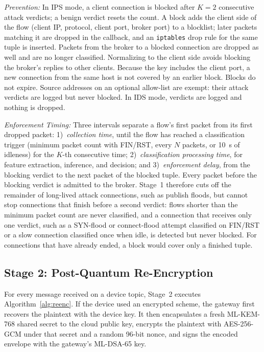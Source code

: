 \documentclass[journal]{IEEEtran}
\begin{document}
\textit{Prevention:} In IPS mode, a client connection is blocked after $K = 2$ consecutive attack verdicts; a benign verdict resets the count. A block adds the client side of the flow (client IP, protocol, client port, broker port) to a blocklist; later packets matching it are dropped in the callback, and an \texttt{iptables} drop rule for the same tuple is inserted. Packets from the broker to a blocked connection are dropped as well and are no longer classified. Normalizing to the client side avoids blocking the broker's replies to other clients. Because the key includes the client port, a new connection from the same host is not covered by an earlier block. Blocks do not expire. Source addresses on an optional allow-list are exempt: their attack verdicts are logged but never blocked. In IDS mode, verdicts are logged and nothing is dropped.

\textit{Enforcement Timing:} Three intervals separate a flow's first packet from its first dropped packet: 1)~\emph{collection time}, until the flow has reached a classification trigger (minimum packet count with FIN/RST, every $N$ packets, or 10~s of idleness) for the $K$-th consecutive time; 2)~\emph{classification processing time}, for feature extraction, inference, and decision; and 3)~\emph{enforcement delay}, from the blocking verdict to the next packet of the blocked tuple. Every packet before the blocking verdict is admitted to the broker. Stage~1 therefore cuts off the remainder of long-lived attack connections, such as publish floods, but cannot stop connections that finish before a second verdict: flows shorter than the minimum packet count are never classified, and a connection that receives only one verdict, such as a SYN-flood or connect-flood attempt classified on FIN/RST or a slow connection classified once when idle, is detected but never blocked. For connections that have already ended, a block would cover only a finished tuple.

\subsection{Stage 2: Post-Quantum Re-Encryption}
\label{sec:stage2}

For every message received on a device topic, Stage~2 executes Algorithm~\ref{alg:reenc}. If the device used an encrypted scheme, the gateway first recovers the plaintext with the device key. It then encapsulates a fresh ML-KEM-768 shared secret to the cloud public key, encrypts the plaintext with AES-256-GCM under that secret and a random 96-bit nonce, and signs the encoded envelope with the gateway's ML-DSA-65 key.
\end{document}
